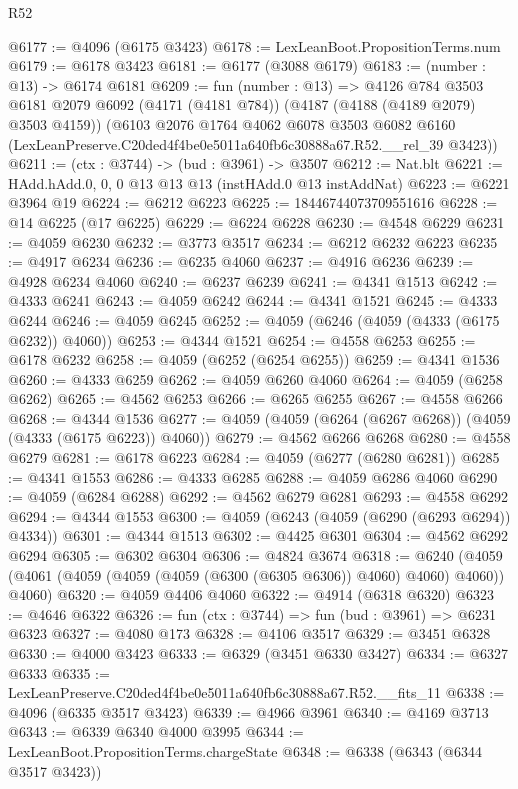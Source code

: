 \begin{lexlean}{R52}
\begin{coremodule}
@6177 := @4096 (@6175 @3423)
@6178 := LexLeanBoot.PropositionTerms.num
@6179 := @6178 @3423
@6181 := @6177 (@3088 @6179)
@6183 := (number : @13) -> @6174 @6181
@6209 := fun (number : @13) =>
  @4126
    @784
    @3503
    @6181
    @2079
    @6092
    (@4171 (@4181 @784))
    (@4187 (@4188 (@4189 @2079) @3503 @4159))
    (@6103
      @2076
      @1764
      @4062
      @6078
      @3503
      @6082
      @6160
      (LexLeanPreserve.C20ded4f4be0e5011a640fb6c30888a67.R52.__rel_39 @3423))
@6211 := (ctx : @3744) -> (bud : @3961) -> @3507
@6212 := Nat.blt
@6221 := HAdd.hAdd.{0, 0, 0} @13 @13 @13 (instHAdd.{0} @13 instAddNat)
@6223 := @6221 @3964 @19
@6224 := @6212 @6223
@6225 := 18446744073709551616
@6228 := @14 @6225 (@17 @6225)
@6229 := @6224 @6228
@6230 := @4548 @6229
@6231 := @4059 @6230
@6232 := @3773 @3517
@6234 := @6212 @6232 @6223
@6235 := @4917 @6234
@6236 := @6235 @4060
@6237 := @4916 @6236
@6239 := @4928 @6234 @4060
@6240 := @6237 @6239
@6241 := @4341 @1513
@6242 := @4333 @6241
@6243 := @4059 @6242
@6244 := @4341 @1521
@6245 := @4333 @6244
@6246 := @4059 @6245
@6252 := @4059 (@6246 (@4059 (@4333 (@6175 @6232)) @4060))
@6253 := @4344 @1521
@6254 := @4558 @6253
@6255 := @6178 @6232
@6258 := @4059 (@6252 (@6254 @6255))
@6259 := @4341 @1536
@6260 := @4333 @6259
@6262 := @4059 @6260 @4060
@6264 := @4059 (@6258 @6262)
@6265 := @4562 @6253
@6266 := @6265 @6255
@6267 := @4558 @6266
@6268 := @4344 @1536
@6277 := @4059 (@4059 (@6264 (@6267 @6268)) (@4059 (@4333 (@6175 @6223)) @4060))
@6279 := @4562 @6266 @6268
@6280 := @4558 @6279
@6281 := @6178 @6223
@6284 := @4059 (@6277 (@6280 @6281))
@6285 := @4341 @1553
@6286 := @4333 @6285
@6288 := @4059 @6286 @4060
@6290 := @4059 (@6284 @6288)
@6292 := @4562 @6279 @6281
@6293 := @4558 @6292
@6294 := @4344 @1553
@6300 := @4059 (@6243 (@4059 (@6290 (@6293 @6294)) @4334))
@6301 := @4344 @1513
@6302 := @4425 @6301
@6304 := @4562 @6292 @6294
@6305 := @6302 @6304
@6306 := @4824 @3674
@6318 := @6240 (@4059 (@4061 (@4059 (@4059 (@4059 (@6300 (@6305 @6306)) @4060) @4060) @4060)) @4060)
@6320 := @4059 @4406 @4060
@6322 := @4914 (@6318 @6320)
@6323 := @4646 @6322
@6326 := fun (ctx : @3744) => fun (bud : @3961) => @6231 @6323
@6327 := @4080 @173
@6328 := @4106 @3517
@6329 := @3451 @6328
@6330 := @4000 @3423
@6333 := @6329 (@3451 @6330 @3427)
@6334 := @6327 @6333
@6335 := LexLeanPreserve.C20ded4f4be0e5011a640fb6c30888a67.R52.__fits_11
@6338 := @4096 (@6335 @3517 @3423)
@6339 := @4966 @3961
@6340 := @4169 @3713
@6343 := @6339 @6340 @4000 @3995
@6344 := LexLeanBoot.PropositionTerms.chargeState
@6348 := @6338 (@6343 (@6344 @3517 @3423))

\end{coremodule}
\end{lexlean}
